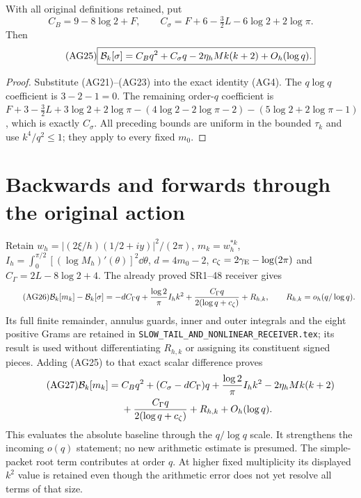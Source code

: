 \begin{theorem}
With all original definitions retained, put
\begin{equation}\tag{AG24}
 C_B=9-8\log2+F,\qquad
 C_\sigma=F+6-\tfrac32L-6\log2+2\log\pi.
\end{equation}
Then
\begin{equation}\tag{AG25}
 \boxed{\mathcal B_k[\sigma]=C_Bq^2+C_\sigma q
       -2\eta_hM k(k+2)+O_h(\log q).}
\end{equation}
\end{theorem}
\begin{proof}
Substitute (AG21)--(AG23) into the exact identity (AG4).
The $q\log q$ coefficient is $3-2-1=0$.
The remaining order-$q$ coefficient is
$F+3-\tfrac32L+3\log2+2\log\pi
-(4\log2-2\log\pi-2)-(5\log2+2\log\pi-1)$,
which is exactly $C_\sigma$. All preceding bounds are uniform in the
bounded $\tau_k$ and use $k^4/q^2\le1$; they apply to every fixed $m_0$.
\end{proof}

\section{Backwards and forwards through the original action}
Retain $w_h=|(2\xi/h)(1/2+iy)|^2/(2\pi)$, $m_k=w_h^{*k}$,
$I_h=\int_0^{\pi/2}[(\log M_h)'(\theta)]^2\dd\theta$,
$d=4m_0-2$, $c_\zeta=2\gamma_{\rm E}-\log(2\pi)$ and
$C_\Gamma=2L-8\log2+4$. The already proved SR1--48 receiver gives
\begin{equation}\tag{AG26}
 \mathcal B_k[m_k]-\mathcal B_k[\sigma]
 =-dC_\Gamma q+\frac{\log2}{\pi}I_hk^2
  +\frac{C_\Gamma q}{2(\log q+c_\zeta)}+R_{h,k},
 \qquad R_{h,k}=o_h(q/\log q).
\end{equation}
Its full finite remainder, annulus guards, inner and outer integrals and
the eight positive Grams are retained in
\texttt{SLOW\_TAIL\_AND\_NONLINEAR\_RECEIVER.tex}; its result is used
without differentiating $R_{h,k}$ or assigning its constituent signed pieces.
Adding (AG25) to that exact scalar difference proves
\begin{align}\tag{AG27}
 \mathcal B_k[m_k]={}&C_Bq^2+(C_\sigma-dC_\Gamma)q
 +\frac{\log2}{\pi}I_hk^2-2\eta_hMk(k+2)\\
 &+\frac{C_\Gamma q}{2(\log q+c_\zeta)}
 +R_{h,k}+O_h(\log q).\notag
\end{align}
This evaluates the absolute baseline through the $q/\log q$ scale.
It strengthens the incoming $o(q)$ statement; no new arithmetic estimate
is presumed. The simple-packet root term contributes at order $q$.
At higher fixed multiplicity its displayed $k^2$ value is retained even
though the arithmetic error does not yet resolve all terms of that size.

